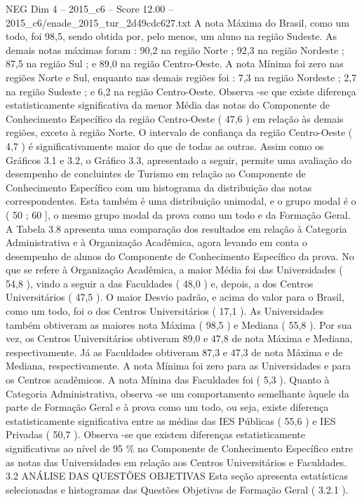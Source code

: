 \begin{textsample}{NEG Dim 4 – 2015\_c6 – Score 12.00 – 2015\_c6/enade\_2015\_tur\_2d49cdc627.txt}
A nota Máxima do Brasil, como um todo, foi 98,5, sendo obtida por, pelo menos, um aluno na região Sudeste.
As demais notas máximas foram : 90,2 na região Norte ; 92,3 na região Nordeste ; 87,5 na região Sul ; e 89,0 na região Centro-Oeste.
A nota Mínima foi zero nas regiões Norte e Sul, enquanto nas demais regiões foi : 7,3 na região Nordeste ; 2,7 na região Sudeste ; e 6,2 na região Centro-Oeste.
Observa -se que existe diferença estatisticamente significativa da menor Média das notas do Componente de Conhecimento Específico da região Centro-Oeste ( 47,6 ) em relação às demais regiões, exceto à região Norte.
O intervalo de confiança da região Centro-Oeste ( 4,7 ) é significativamente maior do que de todas as outras.
Assim como os Gráficos 3.1 e 3.2, o Gráfico 3.3, apresentado a seguir, permite uma avaliação do desempenho de concluintes de Turismo em relação ao Componente de Conhecimento Específico com um histograma da distribuição das notas correspondentes.
Esta também é uma distribuição unimodal, e o grupo modal é o ( 50 ; 60 ], o mesmo grupo modal da prova como um todo e da Formação Geral.
A Tabela 3.8 apresenta uma comparação dos resultados em relação à Categoria Administrativa e à Organização Acadêmica, agora levando em conta o desempenho de alunos do Componente de Conhecimento Específico da prova.
No que se refere à Organização Acadêmica, a maior Média foi das Universidades ( 54,8 ), vindo a seguir a das Faculdades ( 48,0 ) e, depois, a dos Centros Universitários ( 47,5 ).
O maior Desvio padrão, e acima do valor para o Brasil, como um todo, foi o dos Centros Universitários ( 17,1 ).
As Universidades também obtiveram as maiores nota Máxima ( 98,5 ) e Mediana ( 55,8 ).
Por sua vez, os Centros Universitários obtiveram 89,0 e 47,8 de nota Máxima e Mediana, respectivamente.
Já as Faculdades obtiveram 87,3 e 47,3 de nota Máxima e de Mediana, respectivamente.
A nota Mínima foi zero para as Universidades e para os Centros acadêmicos.
A nota Mínina das Faculdades foi ( 5,3 ).
Quanto à Categoria Administrativa, observa -se um comportamento semelhante àquele da parte de Formação Geral e à prova como um todo, ou seja, existe diferença estatisticamente significativa entre as médias das IES Públicas ( 55,6 ) e IES Privadas ( 50,7 ).
Observa -se que existem diferenças estatisticamente significativas ao nível de 95 \% no Componente de Conhecimento Específico entre as notas das Universidades em relação aos Centros Universitários e Faculdades. 3.2 ANÁLISE DAS QUESTÕES OBJETIVAS Esta seção apresenta estatísticas selecionadas e histogramas das Questões Objetivas de Formação Geral ( 3.2.1 ).

\end{textsample}

